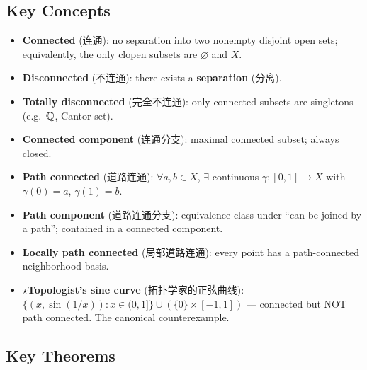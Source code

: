 \documentclass{article}
\newcommand{\starKey}{\textcolor{red!65!black}{\textbf{$\star$}}}
\begin{document}
\subsection{Key Concepts}

\begin{itemize}
  \item \textbf{Connected} (连通): no separation into two nonempty disjoint open sets;
  equivalently, the only clopen subsets are $\varnothing$ and $X$.
  \item \textbf{Disconnected} (不连通): there exists a \textbf{separation} (分离).
  \item \textbf{Totally disconnected} (完全不连通): only connected subsets are
  singletons (e.g.\ $\mathbb{Q}$, Cantor set).
  \item \textbf{Connected component} (连通分支): maximal connected subset; always closed.
  \item \textbf{Path connected} (道路连通): $\forall a,b\in X$, $\exists$ continuous
  $\gamma:[0,1]\to X$ with $\gamma(0)=a$, $\gamma(1)=b$.
  \item \textbf{Path component} (道路连通分支): equivalence class under
  ``can be joined by a path''; contained in a connected component.
  \item \textbf{Locally path connected} (局部道路连通): every point has a
  path-connected neighborhood basis.
  \item \starKey \textbf{Topologist's sine curve} (拓扑学家的正弦曲线):
  $\{(x,\sin(1/x)):x\in(0,1]\}\cup(\{0\}\times[-1,1])$
  --- connected but NOT path connected. The canonical counterexample.
\end{itemize}

\subsection{Key Theorems}
\end{document}
